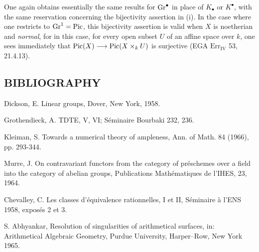 %
One again obtains essentially the same results for \(\Gr^\bullet\) in place of \(K_\bullet\) or \(K^\bullet\), with the same reservation concerning the bijectivity assertion in (i). In the case where one restricts to \(\Gr^1=\Pic\), this bijectivity assertion is valid when \(X\) is noetherian and \emph{normal}, for in this case, for every open subset \(U\) of an affine space over \(k\), one sees immediately that \(\Pic(X)\longrightarrow \Pic(X\times_k U)\) is surjective (EGA \(\mathrm{Err}_{\mathrm{IV}}\) 53, 21.4.13).

\subsection*{BIBLIOGRAPHY}
\begin{enumerate}[label={[\arabic*]}]
\item Dickson, E. Linear groups, Dover, New York, 1958.
\item Grothendieck, A. TDTE, V, VI; Séminaire Bourbaki 232, 236.
\item Kleiman, S. Towards a numerical theory of ampleness, Ann. of Math. 84 (1966), pp. 293-344.
\item Murre, J. On contravariant functors from the category of préschemes over a field into the category of abelian groups, Publications Mathématiques de l'IHES, 23, 1964.
\item Chevalley, C. Les classes d'équivalence rationnelles, I et II, Séminaire à l'ENS 1958, exposés 2 et 3.
\item S. Abhyankar, Resolution of singularities of arithmetical surfaces, in: Arithmetical Algebraic Geometry, Purdue University, Harper--Row, New York 1965.
\end{enumerate}

\providecommand{\Isom}{\operatorname{Isom}}
\providecommand{\Hom}{\operatorname{Hom}}
\providecommand{\Coker}{\operatorname{Coker}}
\providecommand{\Nil}{\operatorname{Nil}}
\providecommand{\im}{\operatorname{Im}}
\providecommand{\coker}{\operatorname{coker}}
\providecommand{\Supp}{\operatorname{Supp}}
\providecommand{\fppf}{\mathrm{fppf}}
\providecommand{\zar}{\mathrm{zar}}
\providecommand{\GL}{\operatorname{Gl}}
\providecommand{\Gr}{\operatorname{Gr}}
\providecommand{\Pic}{\operatorname{Pic}}
\providecommand{\Spec}{\operatorname{Spec}}
\providecommand{\V}{\operatorname{V}}
\providecommand{\Ass}{\operatorname{Ass}}

\providecommand{\Hom}{\operatorname{Hom}}
\providecommand{\Isom}{\operatorname{Isom}}
\providecommand{\Coker}{\operatorname{Coker}}
\providecommand{\Ass}{\operatorname{Ass}}
\providecommand{\sgacircled}[1]{\tikz[baseline=(char.base)]\node[shape=circle,draw,inner sep=.35pt](char){\mbox{\scriptsize #1}};}
\newpage
